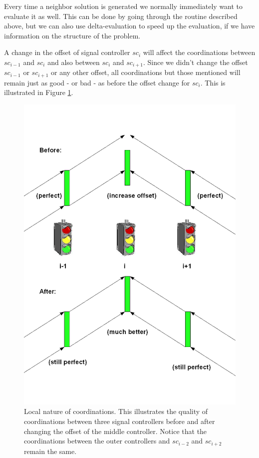 Every time a neighbor solution is generated we normally immediately want to evaluate it as well. This can be done by going through the routine described above, but we can also use delta-evaluation to speed up the evaluation, if we have information on the structure of the problem.

A change in the offset of signal controller $sc_i$ will affect the coordinations between $sc_{i-1}$ and $sc_{i}$ and also between $sc_{i}$ and $sc_{i+1}$. Since we didn't change the offset $sc_{i-1}$ or $sc_{i+1}$ or any other offset, all coordinations but those mentioned will remain just as good - or bad - as before the offset change for $sc_i$. This is illustrated in Figure \ref{fig:delta_eval}.

\begin{figure}[!ht]
\begin{center}
\includegraphics[scale=0.3]{delta_eval.png} 
\end{center}
\caption{Local nature of coordinations. This illustrates the quality of coordinations between three signal controllers before and after changing the offset of the middle controller. Notice that the coordinations between the outer controllers and $sc_{i-2}$ and $sc_{i+2}$ remain the same.}
\label{fig:delta_eval}
\end{figure}


